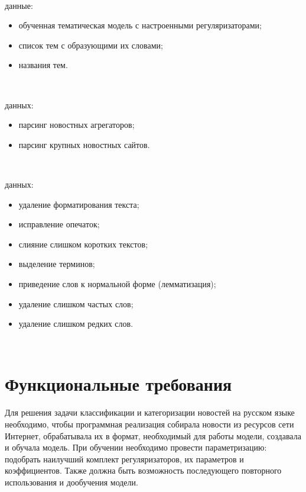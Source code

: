 ~\

 данные:

\begin{itemize}
    \item обученная тематическая модель с настроенными регуляризаторами;
    \item список тем с образующими их словами;
    \item \todo{}названия тем.
\end{itemize}

~\

 данных:

\begin{itemize}
    \item парсинг новостных агрегаторов;
    \item парсинг крупных новостных сайтов.
\end{itemize}

~\

 данных:

\begin{itemize}
    \item удаление форматирования текста;
    \item исправление опечаток;
    \item слияние слишком коротких текстов;
    \item выделение терминов;
    \item приведение слов к нормальной форме (лемматизация);
    \item удаление слишком частых слов;
    \item удаление слишком редких слов.
\end{itemize}

~\



%
\section{Функциональные требования}

Для решения задачи классификации и категоризации новостей на русском языке необходимо, чтобы программная реализация собирала новости из ресурсов сети Интернет, обрабатывала их в формат, необходимый для работы модели, создавала и обучала модель. При обучении необходимо провести параметризацию:  подобрать наилучший комплект регуляризаторов, их параметров и коэффициентов. Также должна быть возможность последующего повторного использования и дообучения модели. 
